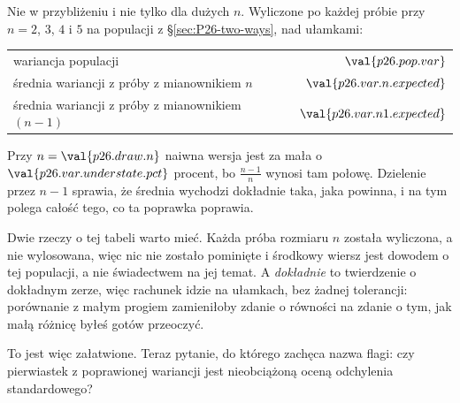 \begin{fr}

Nie w przybliżeniu i nie tylko dla dużych $n$. Wyliczone po każdej próbie
przy $n = 2$, $3$, $4$ i $5$ na populacji z
\S\ref{sec:P26-two-ways}, nad ułamkami:

\begin{center}
\begin{tabular}{lr}
\toprule
wariancja populacji & $\val{p26.pop.var}$ \\
średnia wariancji z próby z mianownikiem $n$ &
  $\val{p26.var.n.expected}$ \\
średnia wariancji z próby z mianownikiem $(n-1)$ &
  $\val{p26.var.n1.expected}$ \\
\bottomrule
\end{tabular}
\end{center}

Przy $n = \val{p26.draw.n}$ naiwna wersja jest za mała o
$\val{p26.var.understate.pct}$ procent, bo $\frac{n-1}{n}$ wynosi tam połowę.
Dzielenie przez $n-1$ sprawia, że średnia wychodzi dokładnie taka, jaka
powinna, i na tym polega całość tego, co ta poprawka poprawia.

Dwie rzeczy o tej tabeli warto mieć. Każda próba rozmiaru $n$ została
wyliczona, a nie wylosowana, więc nic nie zostało pominięte i środkowy
wiersz jest dowodem o tej populacji, a nie świadectwem na jej temat. A
\emph{dokładnie} to twierdzenie o dokładnym zerze, więc rachunek idzie na
ułamkach, bez żadnej tolerancji: porównanie z małym progiem zamieniłoby
zdanie o równości na zdanie o tym, jak małą różnicę byłeś gotów przeoczyć.

To jest więc załatwione. Teraz pytanie, do którego zachęca nazwa flagi: czy
pierwiastek z poprawionej wariancji jest nieobciążoną oceną odchylenia
standardowego?
\dotline
\nextframe
\end{fr}

